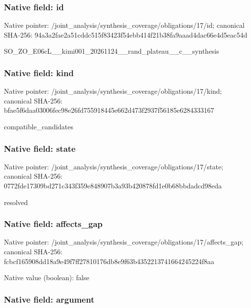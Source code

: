 \documentclass[10pt,a4paper]{article}
\begin{document}
\subsubsection{Native field: id}


Native pointer: /joint\_analysis/synthesi\allowbreak{}s\_coverage/obligations/1\allowbreak{}7/id; canonical SHA-256: 94a3a2fae2a51cddc515f834\allowbreak{}23f54ebb414f21b38fa9aaad\allowbreak{}4dac66e4d5eac54d


SO\_ZO\_E06cL\_\_kimi001\_202\allowbreak{}61124\_\_rand\_plateau\_\_c\_\_\allowbreak{}synthesis


\subsubsection{Native field: kind}


Native pointer: /joint\_analysis/synthesi\allowbreak{}s\_coverage/obligations/1\allowbreak{}7/kind; canonical SHA-256: bfae5f6daa03006fec98e26f\allowbreak{}d755918445e662d473f2937f\allowbreak{}56185e6284333167


compatible\_candidates


\subsubsection{Native field: state}


Native pointer: /joint\_analysis/synthesi\allowbreak{}s\_coverage/obligations/1\allowbreak{}7/state; canonical SHA-256: 0772fde17309bd271c343f35\allowbreak{}9e848907b3a93b420878fd1e\allowbreak{}0b68bbdadcd98eda


resolved


\subsubsection{Native field: affects\_gap}


Native pointer: /joint\_analysis/synthesi\allowbreak{}s\_coverage/obligations/1\allowbreak{}7/affects\_gap; canonical SHA-256: fcbcf165908dd18a9e49f7ff\allowbreak{}27810176db8e9f63b4352213\allowbreak{}741664245224f8aa



Native value (boolean): false



\subsubsection{Native field: argument}
\end{document}
